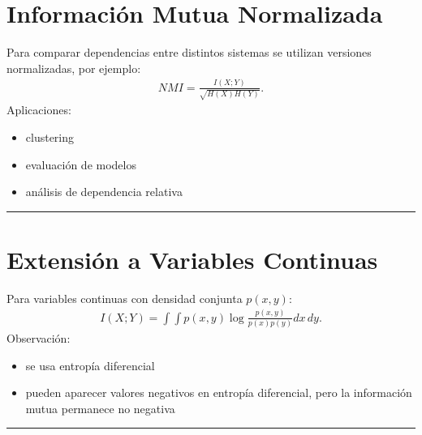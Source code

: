 \documentclass[letterpaper,10pt,english]{jupyterBook}
\begin{document}
\section{Información Mutua Normalizada}
\label{\detokenize{01_theory/mutual_information:informacion-mutua-normalizada}}
\sphinxAtStartPar
Para comparar dependencias entre distintos sistemas se utilizan versiones
normalizadas, por ejemplo:
\begin{equation*}
\begin{split}
NMI=\frac{I(X;Y)}{\sqrt{H(X)H(Y)}}.
\end{split}
\end{equation*}
\sphinxAtStartPar
Aplicaciones:
\begin{itemize}
\item {} 
\sphinxAtStartPar
clustering

\item {} 
\sphinxAtStartPar
evaluación de modelos

\item {} 
\sphinxAtStartPar
análisis de dependencia relativa

\end{itemize}


\bigskip\hrule\bigskip



\section{Extensión a Variables Continuas}
\label{\detokenize{01_theory/mutual_information:extension-a-variables-continuas}}
\sphinxAtStartPar
Para variables continuas con densidad conjunta \(p(x,y)\):
\begin{equation*}
\begin{split}
I(X;Y)=\int\int p(x,y)\log\frac{p(x,y)}{p(x)p(y)}dx\,dy.
\end{split}
\end{equation*}
\sphinxAtStartPar
Observación:
\begin{itemize}
\item {} 
\sphinxAtStartPar
se usa entropía diferencial

\item {} 
\sphinxAtStartPar
pueden aparecer valores negativos en entropía diferencial, pero
la información mutua permanece no negativa

\end{itemize}


\bigskip\hrule\bigskip
\end{document}
